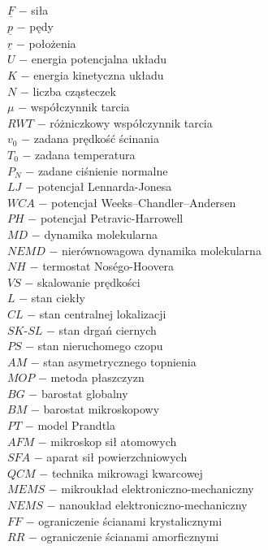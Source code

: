 \documentclass[12pt,a4paper,openright]{report} %
\begin{document}
\begin{spacing}{1.2}
\noindent
$\underline{F}$ $-$ siła\\
$\underline{p}$ $-$ pędy\\
$\underline{r}$ $-$ położenia\\
$U$ $-$ energia potencjalna układu\\
$K$ $-$ energia kinetyczna układu\\
$N$ $-$ liczba cząsteczek\\
$\mu$ $-$ współczynnik tarcia\\
$RWT$ $-$ różniczkowy współczynnik tarcia\\
$v_0$ $-$ zadana prędkość ścinania\\
$T_0$ $-$ zadana temperatura\\
$P_N$ $-$ zadane ciśnienie normalne\\
$LJ$ $-$ potencjał Lennarda-Jonesa\\
$WCA$ $-$ potencjał Weeks–Chandler–Andersen\\
$PH$ $-$ potencjał Petravic-Harrowell\\
$MD$ $-$ dynamika molekularna\\
$NEMD$ $-$ nierównowagowa dynamika molekularna\\
$NH$ $-$ termostat Nos\'{e}go-Hoovera\\
$VS$ $-$ skalowanie prędkości\\
$L$ $-$ stan ciekły\\
$CL$ $-$ stan centralnej lokalizacji\\
$SK\text{-}SL$ $-$ stan drgań ciernych\\
$PS$ $-$ stan nieruchomego czopu\\
$AM$ $-$ stan asymetrycznego topnienia\\
$MOP$ $-$ metoda płaszczyzn\\
$BG$ $-$ barostat globalny\\
$BM$ $-$ barostat mikroskopowy\\
$PT$ $-$ model Prandtla\\
$AFM$ $-$ mikroskop sił atomowych\\
$SFA$ $-$ aparat sił powierzchniowych\\
$QCM$ $-$ technika mikrowagi kwarcowej\\
$MEMS$ $-$ mikroukład elektroniczno-mechaniczny\\
$NEMS$ $-$ nanoukład elektroniczno-mechaniczny\\
$FF$ $-$ ograniczenie ścianami krystalicznymi\\
$RR$ $-$ ograniczenie ścianami amorficznymi\\
\end{spacing}
%
%
\tableofcontents
%
%
\end{document}
